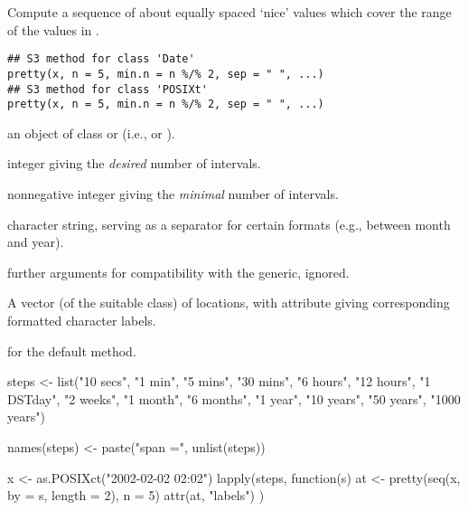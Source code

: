 %
\begin{Description}\relax
Compute a  sequence of about  equally spaced `nice'
values which cover the range of the values in .
\end{Description}
%
\begin{Usage}
\begin{verbatim}
## S3 method for class 'Date'
pretty(x, n = 5, min.n = n %/% 2, sep = " ", ...)
## S3 method for class 'POSIXt'
pretty(x, n = 5, min.n = n %/% 2, sep = " ", ...)
\end{verbatim}
\end{Usage}
%
\begin{Arguments}
\begin{ldescription}
\item[\code{x}] an object of class  or  (i.e.,
 or ). 
\item[\code{n}] integer giving the \emph{desired} number of
intervals.  
\item[\code{min.n}] nonnegative integer giving the \emph{minimal} number of
intervals.  
\item[\code{sep}] character string, serving as a separator for certain
formats (e.g., between month and year). 
\item[\code{...}] further arguments for compatibility with the generic,
ignored.
\end{ldescription}
\end{Arguments}
%
\begin{Value}
A vector (of the suitable class) of locations, with attribute
 giving corresponding formatted character labels.
\end{Value}
%
\begin{SeeAlso}\relax
{} for the default method.
\end{SeeAlso}
%
\begin{Examples}
\begin{ExampleCode}

steps <-
    list("10 secs", "1 min", "5 mins", "30 mins", "6 hours", "12 hours",
         "1 DSTday", "2 weeks", "1 month", "6 months", "1 year",
         "10 years", "50 years", "1000 years")

names(steps) <- paste("span =", unlist(steps))

x <- as.POSIXct("2002-02-02 02:02")
lapply(steps,
       function(s) {
           at <- pretty(seq(x, by = s, length = 2), n = 5)
           attr(at, "labels")
       })

\end{ExampleCode}
\end{Examples}
